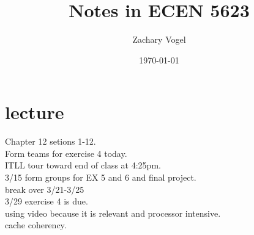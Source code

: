 \documentclass{article}
\author{Zachary Vogel}
\date{\today}
\title{Notes in ECEN 5623}
\begin{document}
\maketitle


\section*{lecture}
Chapter 12 setions 1-12.\\
Form teams for exercise 4 today.\\
ITLL tour toward end of class at 4:25pm.\\
3/15 form groups for EX 5 and 6 and final project.\\
break over 3/21-3/25\\
3/29 exercise 4 is due.\\

using video because it is relevant and processor intensive.\\

cache coherency.\\
\end{document}
